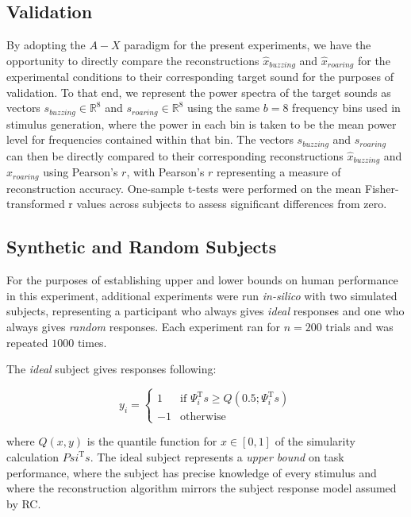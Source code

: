 \documentclass[journal]{IEEEtran}
\begin{document}
\subsection{Validation}

By adopting the $A-X$ paradigm for the present experiments,
we have the opportunity to directly compare the reconstructions
$\hat{x}_{buzzing}$ and $\hat{x}_{roaring}$ for the experimental conditions to their corresponding target sound for the purposes of validation.
To that end, we represent the power spectra of the target sounds as vectors $s_{buzzing} \in \mathbb{R}^\mathrm{8}$ and $s_{roaring} \in \mathbb{R}^\mathrm{8}$ using the same $b=8$ frequency bins used in stimulus generation,
where the power in each bin is taken to be the mean power level for frequencies contained within that bin.
The vectors $s_{buzzing}$ and $s_{roaring}$ can then be directly compared to their corresponding reconstructions
$\hat{x}_{buzzing}$ and $\hat{x}_{roaring}$ using Pearson's $r$, with Pearson's $r$ representing a measure of reconstruction accuracy.
One-sample t-tests were performed on the mean Fisher-transformed r values across subjects to assess significant differences from zero.

\subsection{Synthetic and Random Subjects}

For the purposes of establishing upper and lower bounds on human performance in this experiment,
additional experiments were run \textit{in-silico} with two simulated subjects,
representing a participant who always gives \textit{ideal} responses and one who always gives \textit{random} responses.
Each experiment ran for $n=200$ trials and was repeated $1000$ times.

The \textit{ideal} subject gives responses following:

\begin{equation}
    y_i =
        \begin{cases}
            1 & \text{if } \Psi_i^\mathrm{T} s \geq Q(0.5; \Psi_i^\mathrm{T} s) \\
            -1 & \text{otherwise}
        \end{cases}
\end{equation}

where $Q(x, y)$ is the quantile function for $x \in [0, 1]$ of the simularity calculation $Psi^\mathrm{T} s$.
The ideal subject represents a \textit{upper bound} on task performance,
where the subject has precise knowledge of every stimulus and where the reconstruction algorithm mirrors the subject response model assumed by RC.
\end{document}
